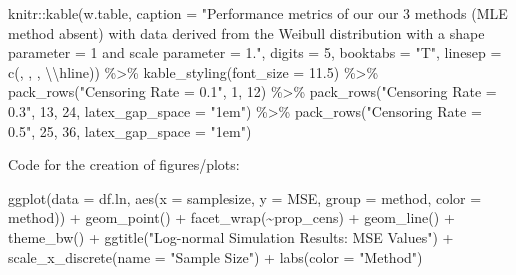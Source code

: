 \documentclass[12pt, twoside]{amherstthesis}
\newenvironment{Shaded}{\begin{snugshade}}{\end{snugshade}}
\newcommand{\AttributeTok}[1]{\textcolor[rgb]{0.77,0.63,0.00}{#1}}
\newcommand{\DecValTok}[1]{\textcolor[rgb]{0.00,0.00,0.81}{#1}}
\newcommand{\FloatTok}[1]{\textcolor[rgb]{0.00,0.00,0.81}{#1}}
\newcommand{\FunctionTok}[1]{\textcolor[rgb]{0.00,0.00,0.00}{#1}}
\newcommand{\NormalTok}[1]{#1}
\newcommand{\SpecialCharTok}[1]{\textcolor[rgb]{0.00,0.00,0.00}{#1}}
\newcommand{\StringTok}[1]{\textcolor[rgb]{0.31,0.60,0.02}{#1}}
\begin{document}
\begin{Shaded}
\begin{Highlighting}[]
\NormalTok{knitr}\SpecialCharTok{::}\FunctionTok{kable}\NormalTok{(w.table, }\AttributeTok{caption =} \StringTok{"Performance metrics of our our 3 methods }
\StringTok{             (MLE method absent) with data derived from the Weibull }
\StringTok{             distribution with a shape parameter = 1 and }
\StringTok{             scale parameter = 1."}\NormalTok{, }
             \AttributeTok{digits =} \DecValTok{5}\NormalTok{, }\AttributeTok{booktabs =} \StringTok{"T"}\NormalTok{, }\AttributeTok{linesep =} \FunctionTok{c}\NormalTok{(}\StringTok{\textquotesingle{}\textquotesingle{}}\NormalTok{, }\StringTok{\textquotesingle{}\textquotesingle{}}\NormalTok{, }\StringTok{\textquotesingle{}\textquotesingle{}}\NormalTok{, }\StringTok{\textquotesingle{}}\SpecialCharTok{\textbackslash{}\textbackslash{}}\StringTok{hline\textquotesingle{}}\NormalTok{)) }\SpecialCharTok{\%\textgreater{}\%}
  \FunctionTok{kable\_styling}\NormalTok{(}\AttributeTok{font\_size =} \FloatTok{11.5}\NormalTok{) }\SpecialCharTok{\%\textgreater{}\%}
  \FunctionTok{pack\_rows}\NormalTok{(}\StringTok{"Censoring Rate = 0.1"}\NormalTok{, }\DecValTok{1}\NormalTok{, }\DecValTok{12}\NormalTok{) }\SpecialCharTok{\%\textgreater{}\%}
  \FunctionTok{pack\_rows}\NormalTok{(}\StringTok{"Censoring Rate = 0.3"}\NormalTok{, }\DecValTok{13}\NormalTok{, }\DecValTok{24}\NormalTok{, }\AttributeTok{latex\_gap\_space =} \StringTok{"1em"}\NormalTok{) }\SpecialCharTok{\%\textgreater{}\%}
  \FunctionTok{pack\_rows}\NormalTok{(}\StringTok{"Censoring Rate = 0.5"}\NormalTok{, }\DecValTok{25}\NormalTok{, }\DecValTok{36}\NormalTok{, }\AttributeTok{latex\_gap\_space =} \StringTok{"1em"}\NormalTok{)}
\end{Highlighting}
\end{Shaded}
Code for the creation of figures/plots:
\begin{Shaded}
\begin{Highlighting}[]
\FunctionTok{ggplot}\NormalTok{(}\AttributeTok{data =}\NormalTok{ df.ln, }\FunctionTok{aes}\NormalTok{(}\AttributeTok{x =}\NormalTok{ samplesize, }\AttributeTok{y =}\NormalTok{ MSE, }\AttributeTok{group =}\NormalTok{ method, }\AttributeTok{color =}\NormalTok{ method)) }\SpecialCharTok{+} 
  \FunctionTok{geom\_point}\NormalTok{() }\SpecialCharTok{+}
  \FunctionTok{facet\_wrap}\NormalTok{(}\SpecialCharTok{\textasciitilde{}}\NormalTok{prop\_cens) }\SpecialCharTok{+}
  \FunctionTok{geom\_line}\NormalTok{() }\SpecialCharTok{+} 
  \FunctionTok{theme\_bw}\NormalTok{() }\SpecialCharTok{+}
  \FunctionTok{ggtitle}\NormalTok{(}\StringTok{"Log{-}normal Simulation Results: MSE Values"}\NormalTok{) }\SpecialCharTok{+}
  \FunctionTok{scale\_x\_discrete}\NormalTok{(}\AttributeTok{name =} \StringTok{"Sample Size"}\NormalTok{) }\SpecialCharTok{+}
  \FunctionTok{labs}\NormalTok{(}\AttributeTok{color =} \StringTok{"Method"}\NormalTok{)}
\end{Highlighting}
\end{Shaded}
\end{document}
